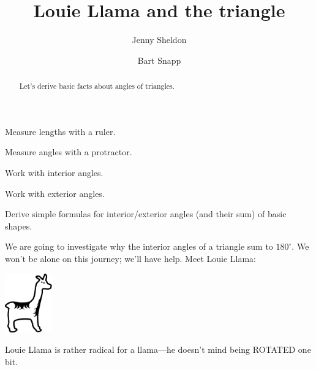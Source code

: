 \documentclass[nooutcomes,noauthor,handout,12pt]{ximera}
\title{Louie Llama and the triangle}
\author{Jenny Sheldon \and Bart Snapp}
\begin{document}
\begin{abstract}
  Let's derive basic facts about angles of triangles.
\end{abstract}
\maketitle


\begin{listOutcomes}
\item Measure lengths with a ruler. 
\item Measure angles with a protractor.
\item Work with interior angles.
\item Work with exterior angles.
\item Derive simple formulas for interior/exterior angles (and their
  sum) of basic shapes.
\end{listOutcomes}

We are going to investigate why the interior angles of a triangle sum
to $180^\circ$. We won't be alone on this journey; we'll have help.
Meet Louie Llama:
\begin{center}
\includegraphics[height=1in]{llama.pdf}
\end{center}

Louie Llama is rather radical for a llama---he doesn't mind being
ROTATED one bit.

\mynewpage
\end{document}
